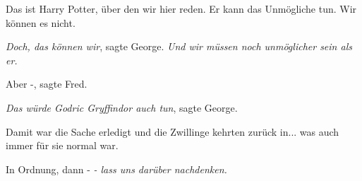 \glqq{}Das ist Harry Potter, über den wir hier reden. Er kann das Unmögliche tun.
Wir können es nicht.\grqq{}

\glqq{}\emph{Doch, das können wir}\grqq{}, sagte George. \glqq{}\emph{Und wir
müssen noch unmöglicher sein als er.}\grqq{}

\glqq{}Aber -\grqq{}, sagte Fred.

\glqq{}\emph{Das würde Godric Gryffindor auch tun}\grqq{}, sagte George.

Damit war die Sache erledigt und die Zwillinge kehrten zurück in... was auch
immer für sie normal war.

\glqq{}In Ordnung, dann -\grqq{} \glqq{}\emph{- lass uns darüber
nachdenken.}\grqq{}

